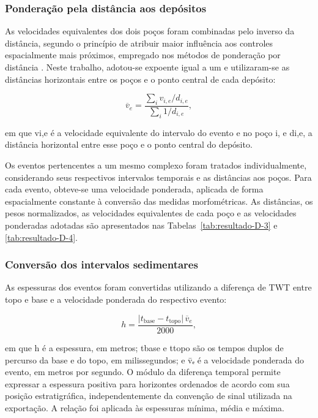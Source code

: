 \subsubsection{Ponderação pela distância aos depósitos}\label{sec:4-3-8-2}

As velocidades equivalentes dos dois poços foram combinadas pelo inverso da distância, segundo o princípio de atribuir maior influência aos controles espacialmente mais próximos, empregado nos métodos de ponderação por distância \cite{shepard1968}. Neste trabalho, adotou-se expoente igual a um e utilizaram-se as distâncias horizontais entre os poços e o ponto central de cada depósito:

\begin{equation}
  \overline{v}_e=\frac{\sum_i v_{i,e}/d_{i,e}}{\sum_i 1/d_{i,e}},
  \label{eq:velocidade-ponderada}
\end{equation}

\noindent
em que vi,e é a velocidade equivalente do intervalo do evento e no poço i, e di,e, a distância horizontal entre esse poço e o ponto central do depósito.

Os eventos pertencentes a um mesmo complexo foram tratados individualmente, considerando seus respectivos intervalos temporais e as distâncias aos poços. Para cada evento, obteve-se uma velocidade ponderada, aplicada de forma espacialmente constante à conversão das medidas morfométricas. As distâncias, os pesos normalizados, as velocidades equivalentes de cada poço e as velocidades ponderadas adotadas são apresentados nas Tabelas~\ref{tab:resultado-D-3} e \ref{tab:resultado-D-4}.

\subsubsection{Conversão dos intervalos sedimentares}\label{sec:4-3-8-3}

As espessuras dos eventos foram convertidas utilizando a diferença de TWT entre topo e base e a velocidade ponderada do respectivo evento:

\begin{equation}
  h=\frac{\lvert t_{\mathrm{base}}-t_{\mathrm{topo}}\rvert\,\overline{v}_e}{2000},
  \label{eq:conversao-espessura}
\end{equation}

\noindent
em que h é a espessura, em metros; tbase e ttopo são os tempos duplos de percurso da base e do topo, em milissegundos; e v̄ₑ é a velocidade ponderada do evento, em metros por segundo. O módulo da diferença temporal permite expressar a espessura positiva para horizontes ordenados de acordo com sua posição estratigráfica, independentemente da convenção de sinal utilizada na exportação. A relação foi aplicada às espessuras mínima, média e máxima.

